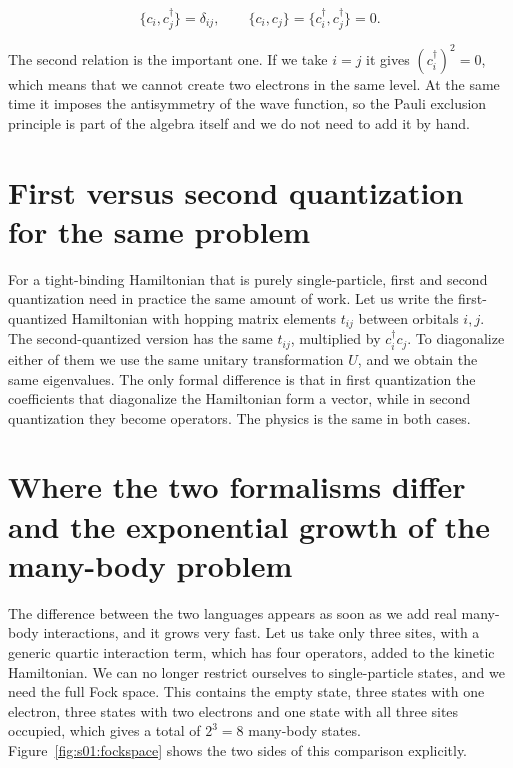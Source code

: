 \begin{equation}
\{c_i, c_j^\dagger\} = \delta_{ij}, \qquad \{c_i, c_j\} = \{c_i^\dagger, c_j^\dagger\} = 0.
\end{equation}

The second relation is the important one. If we take $i=j$ it gives $(c_i^\dagger)^2 = 0$, which
means that we cannot create two electrons in the same level. At the same time it imposes the
antisymmetry of the wave function, so the Pauli exclusion principle is part of the algebra itself
and we do not need to add it by hand.

\section{First versus second quantization for the same problem}

For a tight-binding Hamiltonian that is purely single-particle, first and second quantization need
in practice the same amount of work. Let us write the first-quantized Hamiltonian with hopping
matrix elements $t_{ij}$ between orbitals $i,j$. The second-quantized version has the same $t_{ij}$,
multiplied by $c_i^\dagger c_j$. To diagonalize either of them we use the same unitary
transformation $U$, and we obtain the same eigenvalues. The only formal difference is that in first
quantization the coefficients that diagonalize the Hamiltonian form a vector, while in second
quantization they become operators. The physics is the same in both cases.

\section{Where the two formalisms differ and the exponential growth of the many-body problem}

The difference between the two languages appears as soon as we add real many-body interactions,
and it grows very fast. Let us take only three sites, with a generic quartic interaction term, which
has four operators, added to the kinetic Hamiltonian. We can no longer restrict ourselves to
single-particle states, and we need the full Fock space. This contains the empty state, three states
with one electron, three states with two electrons and one state with all three sites occupied,
which gives a total of $2^3 = 8$ many-body states. Figure~\ref{fig:s01:fockspace} shows the two
sides of this comparison explicitly.



